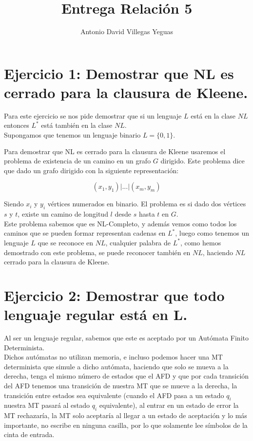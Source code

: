 \documentclass[11pt]{article}
\title{Entrega Relación 5}
\author{Antonio David Villegas Yeguas}
\date{}
\begin{document}
\maketitle


\section*{Ejercicio 1: Demostrar que NL es cerrado para la clausura de Kleene.}

Para este ejercicio se nos pide demostrar que si un lenguaje $L$ está en la clase $NL$ entonces $L^*$ está también en la clase $NL$.\\

Supongamos que tenemos un lenguaje binario $L = \{0, 1\}$.

Para demostrar que NL es cerrado para la clausura de Kleene usaremos el problema de existencia de un camino en un grafo $G$ dirigido. Este problema dice que dado un grafo dirigido con la siguiente representación:

$$ (x_1, y_1)|...|(x_m, y_m) $$

Siendo $x_i$ y $y_i$ vértices numerados en binario. El problema es si dado dos vértices $s$ y $t$, existe un camino de longitud $l$ desde $s$ hasta $t$ en $G$. \\


Este problema sabemos que es NL-Completo, y además vemos como todos los caminos que se pueden formar representan cadenas en $L^*$, luego como tenemos un lenguaje $L$ que se reconoce en $NL$, cualquier palabra de $L^*$, como hemos demostrado con este problema, se puede reconocer también en $NL$, haciendo $NL$ cerrado para la clausura de Kleene.

\section*{Ejercicio 2: Demostrar que todo lenguaje regular está en L.}

	Al ser un lenguaje regular, sabemos que este es aceptado por un Autómata Finito Determinista. \\

Dichos autómatas no utilizan memoria, e incluso podemos hacer una MT determinista que simule a dicho autómata, haciendo que solo se mueva a la derecha, tenga el mismo número de estados que el AFD y que por cada transición del AFD tenemos una transición de nuestra MT que se mueve a la derecha, la transición entre estados sea equivalente (cuando el AFD pasa a un estado $q_i$ nuestra MT pasará al estado $q_i$ equivalente), al entrar en un estado de error la MT rechazaría, la MT solo aceptaría al llegar a un estado de aceptación y lo más importante, no escribe en ninguna casilla, por lo que solamente lee símbolos de la cinta de entrada.\\
\end{document}
